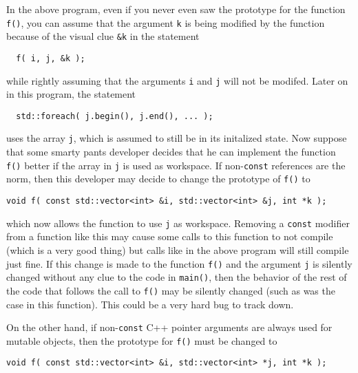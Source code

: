 In the above program, even if you never even saw the prototype
for the function {}\texttt{f()}, you can assume that the argument
{}\texttt{k} is being modified by the function because of the visual
clue {}\texttt{\&k} in the statement

{\scriptsize\begin{verbatim}
  f( i, j, &k );
\end{verbatim}}

{}\noindent{}while rightly assuming that the arguments {}\texttt{i}
and {}\texttt{j} will not be modifed.  Later on in this program,
the statement

{\scriptsize\begin{verbatim}
  std::foreach( j.begin(), j.end(), ... );
\end{verbatim}}

{}\noindent{}uses the array {}\texttt{j}, which is assumed to still be
in its initalized state.  Now suppose that some smarty pants developer
decides that he can implement the function {}\texttt{f()} better if
the array in {}\texttt{j} is used as workspace.  If non-\texttt{const}
references are the norm, then this developer may decide to change the
prototype of {}\texttt{f()} to

{\scriptsize\begin{verbatim}
void f( const std::vector<int> &i, std::vector<int> &j, int *k );
\end{verbatim}}

{}\noindent{}which now allows the function to use {}\texttt{j} as
workspace.  Removing a {}\texttt{const} modifier from a function like
this may cause some calls to this function to not compile (which is a
very good thing) but calls like in the above program will still
compile just fine.  If this change is made to the function
{}\texttt{f()} and the argument {}\texttt{j} is silently changed
without any clue to the code in {}\texttt{main()}, then the behavior
of the rest of the code that follows the call to {}\texttt{f()} may be
silently changed (such as was the case in this function).  This could
be a very hard bug to track down.

On the other hand, if non-\texttt{const} C++ pointer arguments are
always used for mutable objects, then the prototype for {}\texttt{f()}
must be changed to 

{\scriptsize\begin{verbatim}
void f( const std::vector<int> &i, std::vector<int> *j, int *k );
\end{verbatim}}

